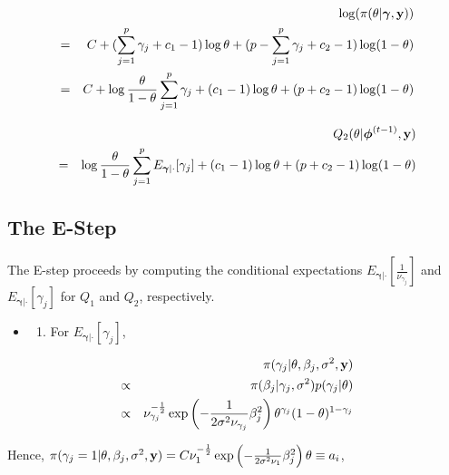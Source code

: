 \documentclass[]{book}
\providecommand{\tightlist}{%
  \setlength{\itemsep}{0pt}\setlength{\parskip}{0pt}}
\begin{document}
\begin{eqnarray*}
            &&\log(\pi(\theta|{\boldsymbol \gamma},{\bf y}))\\
            &=& C+ (\sum_{j=1}^{p}\gamma_j+c_1-1)\log \theta + (p-\sum_{j=1}^{p}\gamma_j+c_2-1)\log
            (1-\theta)\\        
            &=& C+\log \frac{\theta}{1-\theta} \sum_{j=1}^{p}\gamma_j
            + (c_1-1)\log\theta + (p+c_2-1)\log(1-\theta)   
\end{eqnarray*}

\begin{eqnarray*}
            &&Q_2(\theta|{\boldsymbol \phi}^{(t-1)},{\bf y})\\
            &=& \log \frac{\theta}{1-\theta} \sum_{j=1}^{p}E_{{\boldsymbol \gamma}|\cdot}[\gamma_j]+
            (c_1-1)\log\theta + (p+c_2-1)\log(1-\theta) \\
\end{eqnarray*}

\hypertarget{the-e-step}{%
\subsection{The E-Step}\label{the-e-step}}

The E-step proceeds by computing the conditional expectations \(E_{{\boldsymbol \gamma}|\cdot}[\frac{1}{\nu_{\gamma_j}}]\) and \(E_{{\boldsymbol \gamma}|\cdot}[\gamma_j]\) for \(Q_1\) and \(Q_2\), respectively.

\begin{itemize}
\item
  \begin{enumerate}
  \def\labelenumi{(\arabic{enumi})}
  \tightlist
  \item
    For \(E_{{\boldsymbol \gamma}|\cdot}[\gamma_j]\),
  \end{enumerate}
\end{itemize}

\begin{eqnarray*}
            &&\pi(\gamma_j|\theta,\beta_j,\sigma^2,{\bf y})\\
            &\propto&\pi(\beta_j|\gamma_j,\sigma^2)p(\gamma_j|\theta)\\
            &\propto&\nu_{\gamma_j}^{-\frac{1}{2}}\exp\left(-\frac{1}{2\sigma^2\nu_{\gamma_j}}\beta_j^2\right)
            \theta^{\gamma_j}(1-\theta)^{1-\gamma_j}
\end{eqnarray*}

Hence, \(\pi(\gamma_j=1|\theta,\beta_j,\sigma^2,{\bf y})=C \nu_{1}^{-\frac{1}{2}}\exp\left(-\frac{1}{2\sigma^2\nu_{1}}\beta_j^2\right)\theta\equiv a_i\),
\end{document}
